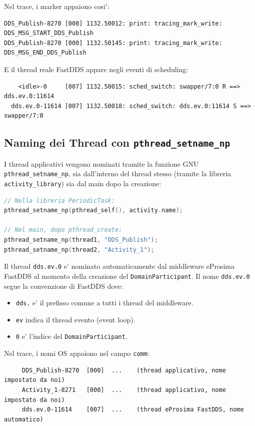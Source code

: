 Nel trace, i marker appaiono cosi':
\begin{verbatim}
DDS_Publish-8270 [000] 1132.50012: print: tracing_mark_write: DDS_MSG_START_DDS_Publish
DDS_Publish-8270 [000] 1132.50145: print: tracing_mark_write: DDS_MSG_END_DDS_Publish
\end{verbatim}

E il thread reale FastDDS appare negli eventi di scheduling:
\begin{verbatim}
    <idle>-0     [007] 1132.50015: sched_switch: swapper/7:0 R ==> dds.ev.0:11614
  dds.ev.0-11614 [007] 1132.50018: sched_switch: dds.ev.0:11614 S ==> swapper/7:0
\end{verbatim}

\subsection{Naming dei Thread con \texttt{pthread\_setname\_np}}
\label{subsec:naming}

I thread applicativi vengono nominati tramite la funzione GNU
\texttt{pthread\_setname\_np}, sia dall'interno del thread stesso
(tramite la libreria \texttt{activity\_library}) sia dal main dopo
la creazione:

\begin{lstlisting}[language=C, caption={Assegnazione del nome ai thread applicativi.}, label={lst:setname}]
// Nella libreria PeriodicTask:
pthread_setname_np(pthread_self(), activity.name);

// Nel main, dopo pthread_create:
pthread_setname_np(thread1, "DDS_Publish");
pthread_setname_np(thread2, "Activity_1");
\end{lstlisting}

Il thread \texttt{dds.ev.0} e' nominato automaticamente dal middleware
eProsima FastDDS al momento della creazione del \texttt{DomainParticipant}.
Il nome \texttt{dds.ev.0} segue la convenzione di FastDDS dove:
\begin{itemize}
    \item \texttt{dds.} e' il prefisso comune a tutti i thread del middleware.
    \item \texttt{ev} indica il thread evento (event loop).
    \item \texttt{0} e' l'indice del \texttt{DomainParticipant}.
\end{itemize}

Nel trace, i nomi OS appaiono nel campo \texttt{comm}:
\begin{verbatim}
     DDS_Publish-8270  [000]  ...    (thread applicativo, nome impostato da noi)
     Activity_1-8271   [000]  ...    (thread applicativo, nome impostato da noi)
     dds.ev.0-11614    [007]  ...    (thread eProsima FastDDS, nome automatico)
\end{verbatim}


